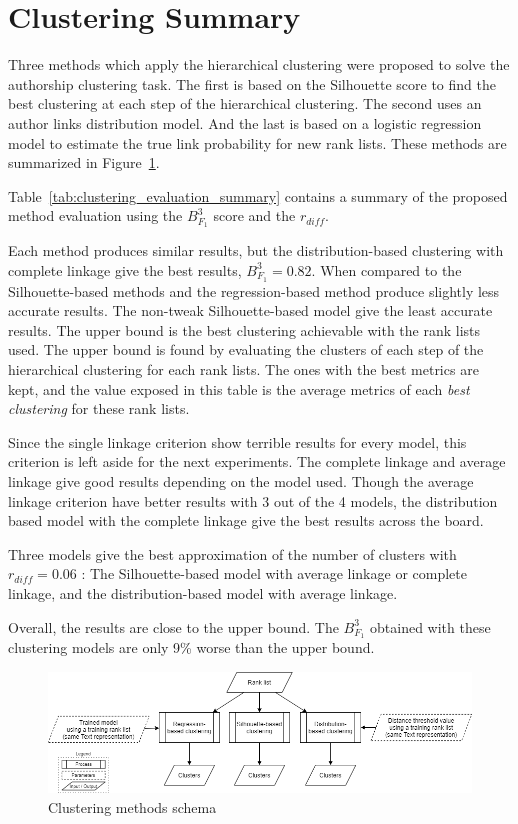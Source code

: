\section{Clustering Summary}

Three methods which apply the hierarchical clustering were proposed to solve the authorship clustering task.
The first is based on the Silhouette score to find the best clustering at each step of the hierarchical clustering.
The second uses an author links distribution model.
And the last is based on a logistic regression model to estimate the true link probability for new rank lists.
These methods are summarized in Figure~\ref{fig:schema-clustering}.

Table~\ref{tab:clustering_evaluation_summary} contains a summary of the proposed method evaluation using the $B^3_{F_1}$ score and the $r_{diff}$.

Each method produces similar results, but the distribution-based clustering with complete linkage give the best results, $B^3_{F_1} = 0.82$.
When compared to the Silhouette-based methods and the regression-based method produce slightly less accurate results.
The non-tweak Silhouette-based model give the least accurate results.
The upper bound is the best clustering achievable with the rank lists used.
The upper bound is found by evaluating the clusters of each step of the hierarchical clustering for each rank lists.
The ones with the best metrics are kept, and the value exposed in this table is the average metrics of each \textit{best clustering} for these rank lists.

Since the single linkage criterion show terrible results for every model, this criterion is left aside for the next experiments.
The complete linkage and average linkage give good results depending on the model used.
Though the average linkage criterion have better results with 3 out of the 4 models, the distribution based model with the complete linkage give the best results across the board.

Three models give the best approximation of the number of clusters with $r_{diff} = 0.06$ :
The Silhouette-based model with average linkage or complete linkage, and the distribution-based model with average linkage.

Overall, the results are close to the upper bound.
The $B^{3}_{F_1}$ obtained with these clustering models are only 9\% worse than the upper bound.

\begin{figure}
  \centering
  \caption{Clustering methods schema}
  \label{fig:schema-clustering}
  \includegraphics[width=1\linewidth]{img/schema-clustering.png}
\end{figure}

